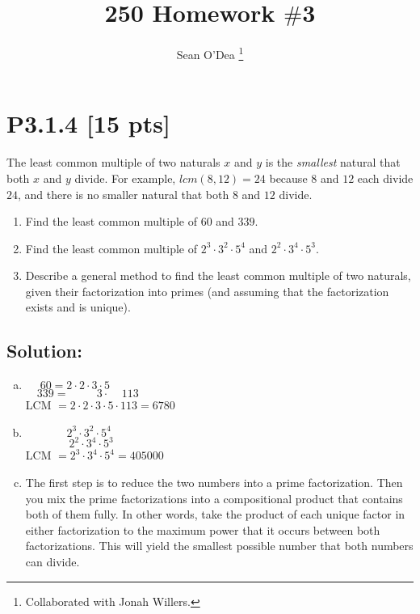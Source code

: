 \documentclass[12pt]{article}
\title{250 Homework $\#$3}
\author{Sean O'Dea \footnote{Collaborated with Jonah Willers.}}
\begin{document}
\maketitle

\section*{\textbf{P3.1.4} [15 pts]}
The least common multiple of two naturals $x$ and $y$ is the \textit{smallest} natural that both $x$ and $y$ divide. For example, $lcm(8, 12) = 24$ because $8$ and $12$ each divide $24$, and there is no smaller natural that both $8$ and $12$ divide.
\begin{enumerate}[label=(\alph*)]
    \item Find the least common multiple of $60$ and $339$.
    \item Find the least common multiple of $2^3 \cdot 3^2 \cdot 5^4$ and $2^2 \cdot 3^4 \cdot 5^3$.
    \item Describe a general method to find the least common multiple of two naturals, given their factorization into primes (and assuming that the factorization exists and is unique).
\end{enumerate}


\subsection*{\textbf{Solution:}}
\begin{enumerate}[(a)]
    \item $\;\;\;\;\,60 = 2 \cdot 2 \cdot 3 \cdot 5$\\
		$~\;\;\:339 = \;\;\;\;\;\;\;\;\:3 \cdot \;\;\;\;113$\\
		LCM $= 2 \cdot 2 \cdot 3 \cdot 5 \cdot 113 = 6780$

    \item $\;\;\;\;\;\;\;\;\;\;\;\;\;2^{3} \cdot 3^{2} \cdot 5^{4}$\\
		$~\;\;\;\;\;\;\;\;\;\;\;\;\;2^{2} \cdot 3^{4} \cdot 5^{3}$\\
		LCM $= 2^{3} \cdot 3^{4} \cdot 5^{4} = 405000$

    \item The first step is to reduce the two numbers into a prime factorization. Then you mix the prime factorizations into a compositional product that contains both of them fully. In other words, take the product of each unique factor in either factorization to the maximum power that it occurs between both factorizations. This will yield the smallest possible number that both numbers can divide.
    
\end{enumerate}
\end{document}

